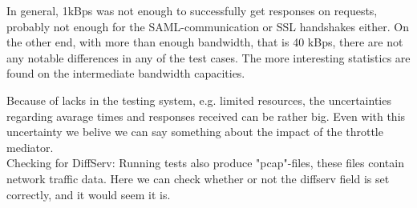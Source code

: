     In general, 1kBps was not enough to successfully get responses on requests, probably not enough for the SAML-communication or SSL handshakes either. On the other end, with more than enough bandwidth, that is 40 kBps, there are not any notable differences in any of the test cases. The more interesting statistics are found on the intermediate bandwidth capacities.

    Because of lacks in the testing system, e.g. limited resources, the uncertainties regarding avarage times and responses received can be rather big. Even with this uncertainty we belive we can say something about the impact of the throttle mediator. \\

    Checking for DiffServ: Running tests also produce "pcap"-files, these files contain network traffic data. Here we can check whether or not the diffserv field is set correctly, and it would seem it is. 
